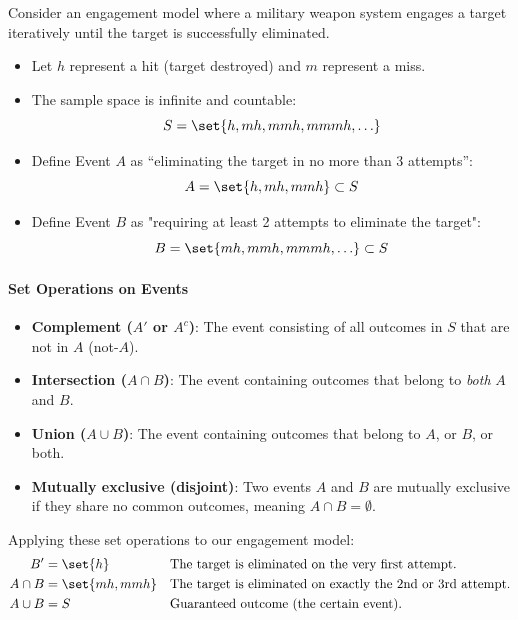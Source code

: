 \begin{example}
    Consider an engagement model where a military weapon system engages a target iteratively until the target is successfully eliminated.\medskip

    \begin{itemize}\setlength\itemsep{1em}
        \item Let $h$ represent a hit (target destroyed) and $m$ represent a miss.
        \item The sample space is infinite and countable:
        \[S = \set{h, mh, mmh, mmmh, \ldots}\]
        \item Define Event $A$ as \enquote{eliminating the target in no more than 3 attempts}:
        \[A = \set{h, mh, mmh} \subset S\]
        \item Define Event $B$ as "requiring at least 2 attempts to eliminate the target":
        \[B = \set{mh, mmh, mmmh, \ldots} \subset S\]
    \end{itemize}
\end{example}

\paragraph{Set Operations on Events}
\begin{itemize}\setlength\itemsep{1em}
    \item \textbf{Complement ($A'$ or $A^c$)}: The event consisting of all outcomes in $S$ that are not in $A$ (not$\text{-}A$).
    \item \textbf{Intersection ($A \cap B$)}: The event containing outcomes that belong to \textit{both} $A$ and $B$.
    \item \textbf{Union ($A \cup B$)}: The event containing outcomes that belong to $A$, or $B$, or both.
    \item \textbf{Mutually exclusive (disjoint)}: Two events $A$ and $B$ are mutually exclusive if they share no common outcomes, meaning $A \cap B = \emptyset$.
\end{itemize}

Applying these set operations to our engagement model:
\begin{align*}
    B' &= \set{h} && \text{The target is eliminated on the very first attempt.} \\
    A \cap B &= \set{mh, mmh} && \text{The target is eliminated on exactly the 2nd or 3rd attempt.} \\
    A \cup B &= S && \text{Guaranteed outcome (the certain event).}
\end{align*}

